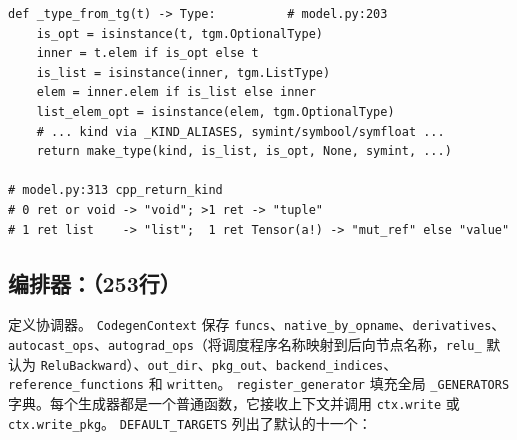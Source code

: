 \begin{lstlisting}[caption={\texttt{\_type\_from\_tg} and return-kind classification.}, label=lst:parse_schema, style=pystyle]
def _type_from_tg(t) -> Type:          # model.py:203
    is_opt = isinstance(t, tgm.OptionalType)
    inner = t.elem if is_opt else t
    is_list = isinstance(inner, tgm.ListType)
    elem = inner.elem if is_list else inner
    list_elem_opt = isinstance(elem, tgm.OptionalType)
    # ... kind via _KIND_ALIASES, symint/symbool/symfloat ...
    return make_type(kind, is_list, is_opt, None, symint, ...)

# model.py:313 cpp_return_kind
# 0 ret or void -> "void"; >1 ret -> "tuple"
# 1 ret list    -> "list";  1 ret Tensor(a!) -> "mut_ref" else "value"
\end{lstlisting}

\subsection{编排器：（253行）}

定义协调器。 \texttt{CodegenContext} 保存 \texttt{funcs}、\texttt{native\_by\_opname}、\texttt{derivatives}、\texttt{autocast\_ops}、\texttt{autograd\_ops}（将调度程序名称映射到后向节点名称，\texttt{relu\_} 默认为 \texttt{ReluBackward}）、\texttt{out\_dir}、\texttt{pkg\_out}、\texttt{backend\_indices}、\texttt{reference\_functions} 和 \texttt{written}。 \texttt{register\_generator} 填充全局 \texttt{\_GENERATORS} 字典。每个生成器都是一个普通函数，它接收上下文并调用 \texttt{ctx.write} 或 \texttt{ctx.write\_pkg}。 \texttt{DEFAULT\_TARGETS} 列出了默认的十一个：

